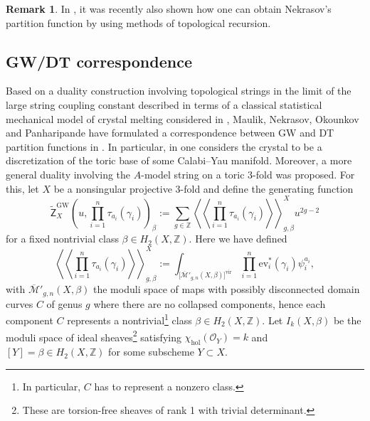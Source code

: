 \documentclass[11pt,colorinlistoftodos]{amsart}
\numberwithin{equation}{subsection}
\theoremstyle{plain}
\theoremstyle{definition}
\newtheorem{rem}[thm]{Remark}
\theoremstyle{remark}
\newcommand{\Z}{\mathbb{Z}}
\newcommand{\calM}{\mathcal{M}}
\begin{document}
\begin{rem}
In \cite{BorotBouchardChidambaramCreutzig2021}, it was recently also shown how one can obtain Nekrasov's partition function by using methods of topological recursion. 
\end{rem}

\subsection{GW/DT correspondence}
Based on a duality construction involving topological strings in the limit of the large string coupling constant described in terms of a classical statistical mechanical model of crystal melting considered in \cite{OkounkovReshetikhinVafa2006}, Maulik, Nekrasov, Okounkov and Panharipande have formulated a correspondence between GW and DT partition functions in \cite{MaulikNekreasovOkounkovPandharipande2006_1,MaulikNekreasovOkounkovPandharipande2006_2}. In particular, in \cite{OkounkovReshetikhinVafa2006} one considers the crystal to be a discretization of the toric base of some Calabi--Yau manifold. Moreover, a more general duality involving the $A$-model string on a toric 3-fold was proposed. 
For this, let $X$ be a nonsingular projective 3-fold and define the generating function 
\begin{equation}
\label{eq:GW_generating_function}
\widetilde{\mathsf{Z}}^\mathrm{GW}_X\left(u, \prod_{i=1}^n\tau_{a_i}(\gamma_i)\right)_\beta:=\sum_{g\in\Z}\left\langle\!\left\langle\prod_{i=1}^n\tau_{a_i}(\gamma_i)\right\rangle\!\right\rangle_{g,\beta}^Xu^{2g-2}
\end{equation}
for a fixed nontrivial class $\beta\in H_2(X,\mathbb{Z})$. Here we have defined
\[
\left\langle\!\left\langle\prod_{i=1}^n\tau_{a_i}(\gamma_i)\right\rangle\!\right\rangle_{g,\beta}^X:=\int_{\big[\overline{\calM}'_{g,n}(X,\beta)\big]^{\mathrm{vir}}}\prod_{i=1}^n\mathrm{ev}^*_i(\gamma_i)\psi_i^{a_i},
\]
with $\overline{\calM}'_{g,n}(X,\beta)$ the moduli space of maps with possibly disconnected domain curves $C$ of genus $g$ where there are no collapsed components, hence each component $C$ represents a nontrivial\footnote{In particular, $C$ has to represent a nonzero class.} class $\beta\in H_2(X,\Z)$. Let $I_k(X,\beta)$ be the moduli space of ideal sheaves\footnote{These are torsion-free sheaves of rank 1 with trivial determinant.} satisfying $\chi_\mathrm{hol}(\mathcal{O}_Y)=k$ and $[Y]=\beta\in H_2(X,\Z)$ for some subscheme $Y\subset X$.
\end{document}
